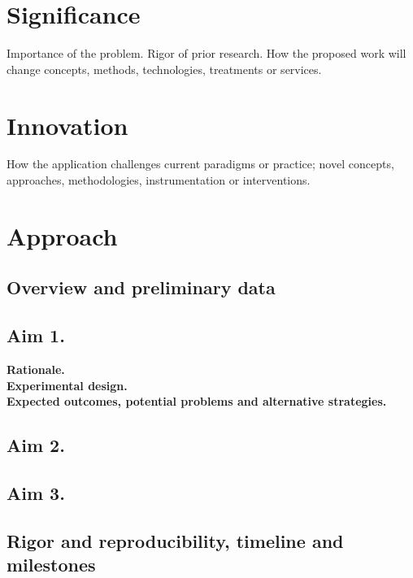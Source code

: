 \documentclass[11pt,letterpaper]{article}
\begin{document}
\section*{Significance}
Importance of the problem. Rigor of prior research. How the proposed work will change concepts, methods, technologies, treatments or services.

\section*{Innovation}
How the application challenges current paradigms or practice; novel concepts, approaches, methodologies, instrumentation or interventions.

\section*{Approach}
\subsection*{Overview and preliminary data}

\subsection*{Aim 1.}
\textbf{Rationale.}\\
\textbf{Experimental design.}\\
\textbf{Expected outcomes, potential problems and alternative strategies.}

\subsection*{Aim 2.}

\subsection*{Aim 3.}

\subsection*{Rigor and reproducibility, timeline and milestones}



\end{document}
